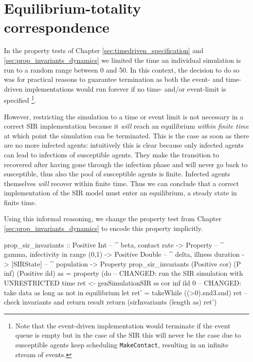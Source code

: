 \chapter{Equilibrium-totality correspondence}
\label{app:equilibrium_totality}
In the property tests of Chapter \ref{sec:timedriven_specification} and \ref{sec:prop_invariants_dynamics} we limited the time an individual simulation is run to a random range between 0 and 50. In this context, the decision to do so was for practical reasons to guarantee termination as both the event- and time-driven implementations would run forever if no time- and/or event-limit is specified \footnote{Note that the event-driven implementation would terminate if the event queue is empty but in the case of the SIR this will never be the case due to susceptible agents keep scheduling \texttt{MakeContact}, resulting in an infinite stream of events.}.

However, restricting the simulation to a time  or event limit is not necessary in a correct SIR implementation because it  \textit{will} reach an equilibrium \textit{within finite time} at which point the simulation can be terminated. This is the case as soon as there are no more infected agents: intuitively this is clear because only infected agents can lead to infections of susceptible agents. They make the transition to recovered after having gone through the infection phase and will never go back to susceptible, thus also the pool of susceptible agents is finite. Infected agents themselves \textit{will} recover within finite time. Thus we can conclude that a correct implementation of the SIR model must enter an equilibrium, a steady state in finite time.

Using this informal reasoning, we change the property test from Chapter \ref{sec:prop_invariants_dynamics} to encode this property implicitly.

\begin{HaskellCode}
prop_sir_invariants :: Positive Int    -- ^ beta, contact rate
                    -> Property        -- ^ gamma, infectivity in range (0,1)
                    -> Positive Double -- ^ delta, illness duration
                    -> [SIRState]      -- ^ population
                    -> Property
prop_sir_invariants 
    (Positive cor) (P inf) (Positive ild) as  = property (do
  -- CHANGED: run the SIR simulation with UNRESTRICTED time
  ret <- genSimulationSIR ss cor inf ild 0
  -- CHANGED: take data as long as not in equilibrium
  let ret' = takeWhile ((>0).snd3.snd) ret
  -- check invariants and return result
  return (sirInvariants (length as) ret')
\end{HaskellCode}

